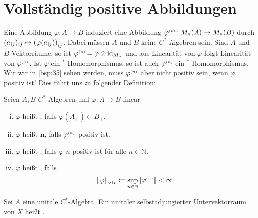\section{Vollständig positive Abbildungen} %
\label{sec:3}

\begin{erinnerungA}[{name=[{induzierte Abbildung auf Matrizen}]}]
	Eine Abbildung $\varphi\colon A \to B$ induziert eine Abbildung $\varphi^\ssbrace{n} \colon M_n(A) \to M_n(B)$ durch $(a_{ij})_{ij} \mapsto \enbrace*{\varphi(a_{ij})}_{ij}$.
	Dabei müssen $A$ und $B$ keine $C^*$-Algebren sein.
	Sind $A$ und $B$ Vektorräume, so ist $\varphi^\ssbrace{n} = \varphi \otimes \id_{M_n}$ und aus Linearität von $\varphi$ folgt Linearität von $\varphi^\ssbrace{n}$.
	Ist $\varphi$ ein $^*$-Homomorphismus, so ist auch $\varphi^\ssbrace{n}$ ein $^*$-Homomorphismus.
	Wir wir in \autoref{bsp:35} sehen werden, muss $\varphi^\ssbrace{n}$ aber nicht positiv sein, wenn $\varphi$ positiv ist!
	Dies führt uns zu folgender Definition:
\end{erinnerungA}

\begin{definition}[{name=[positiv, vollständig positiv und beschränkt]},label=def:32]
	Seien $A,B$ $C^*$-Algebren und $\varphi \colon A \to B$ linear
	\begin{enumerate}[(i),itemsep=1pt]
		\item $\varphi$ heißt , falls $\varphi(A_+) \subset B_+$.
		\item $\varphi$ heißt $\mathbold n$, falls $\varphi^\ssbrace{n}$ positiv ist.
		\item $\varphi$ heißt , falls $\varphi$ $n$-positiv ist für alle $n \in \mathbb{N}$.
		\item $\varphi$ heißt , falls 
		\[
			\norm*{\varphi}_\vb \coloneqq \sup_{n \in \mathbb{N}} \norm*{\varphi^\ssbrace{n}} < \infty
		\]
 	\end{enumerate}
\end{definition}

\begin{definition}[{name=[Operatorsystem]}]
	Sei $A$ eine unitale $C^*$-Algebra. 
	Ein unitaler selbstadjungierter Untervektorraum von $X$ heißt . 
\end{definition}


